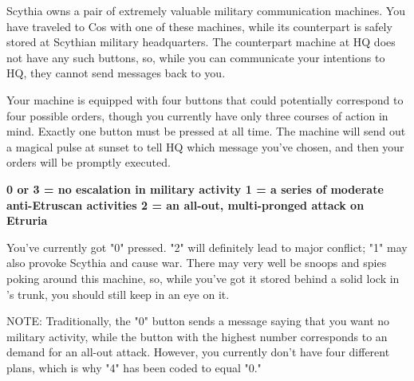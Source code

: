 \documentclass[green]{Kos}
\begin{document}
\name{\gScythiaMachine{}}

Scythia owns a pair of extremely valuable military communication machines. You have traveled to Cos with one of these machines, while its counterpart is safely stored at Scythian military headquarters. The counterpart machine at HQ does not have any such buttons, so, while you can communicate your intentions to HQ, they cannot send messages back to you. 

Your machine is equipped with four buttons that could potentially correspond to four possible orders, though you currently have only three courses of action in mind. Exactly one button must be pressed at all time. The machine will send out a magical pulse at sunset to tell HQ which message you've chosen, and then your orders will be promptly executed.

\bf{0 or 3} = no escalation in military activity
\bf{1} = a series of moderate anti-Etruscan activities
\bf{2} = an all-out, multi-pronged attack on Etruria

You've currently got "0" pressed. "2" will definitely lead to major conflict; "1" may also provoke Scythia and cause war. There may very well be snoops and spies poking around this machine, so, while you've got it stored behind a solid lock in \cScythiaQueen{\nickname}'s trunk, you should still keep in an eye on it.

NOTE: Traditionally, the "0" button sends a message saying that you want no military activity, while the button with the highest number corresponds to an demand for an all-out attack. However, you currently don't have four different plans, which is why "4" has been coded to equal "0."
\end{document}
